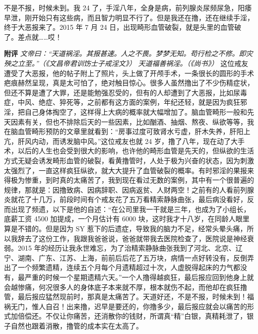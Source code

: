 \begin{case}
    不是不报，时候未到。我 24 了，手淫八年，全身是病，前列腺炎尿频尿急，阳痿早泄，刚开始只有这些病，而且智力明显不行了。但是我还在撸，还在继续手淫，终于大恶报来了。2015 年 7 月 24 日，出现畸形血管破裂，就是头里的血管破了。差点就……哎！

    \textbf{附评} \textit{文帝曰：“天道祸淫。其报甚速。人之不畏。梦梦无知。苟行检之不修。即灾殃之立至。”（《文昌帝君训饬士子戒淫文》）} \textit{天道福善祸淫。（《尚书》）} 这位戒友遭受了大恶报，他的帖子附上了照片，头上做了开颅手术，一条很长的圆形的手术疤痕赫然呈现，真是太可怕了，绝对触目惊心。很多人虽然撸出了不少伤精症状，但还不算是遭了大罪，还是能勉强忍受的，但有的人却遭到了大恶报，比如尿毒症，中风、绝症、猝死等，之前都有这方面的案例，年纪还轻，就是因为疯狂邪淫，把自己身体掏空了，这样得上大病的概率就大幅增加了。脑血管畸形一般和先天因素有关，但也不排除后天的一些因素，比如酗酒、抽烟、熬夜、纵欲等等，我在脑血管畸形预防的文章里就看到：“房事过度可致肾水亏虚，肝木失养，肝阳上亢，肝风内动，而诱发脑中风。”这位戒友也就 24 岁，撸了八年，现在动了大手术，以后的人生也会受到很大的影响，也许他的畸形血管是先天的，但纵欲的生活方式无疑会诱发畸形血管的破裂，看黄撸管时，人处于极为兴奋的状态，因为刺激太强烈了，一直这样疯狂纵欲，就大大提升了血管破裂的概率。有时邪淫的果报来得极为惨重，到时真的太痛苦了，我到现在看过无数的案例，其中有一个很普遍的规律，那就是：因撸致病、因病辞职、因病返贫、人财两空！之前有的人看前列腺炎就花了十几万，前段时间有个戒友花了五万看精索静脉曲张，最后病没看好，反而出现了频遗，以下是他的自述：“在公司里我一干就是三年，也成为了小组长，底薪工资 4500 加提成，一个月估计有 6000 块，这时我才十八岁，在同龄人眼里算是不错的。但是因为 SY 惹下的后遗症，导致我的脑力不足，经常头晕头痛，所以我辞去了这份工作，我跟我爸爸说，爸爸就带我去医院检查了，医院说是神经衰弱。2015 年的经历让我永世难忘，为了治精索静脉曲张我到了河北、北京、辽宁、湖南、广东、江苏、上海，前前后后花了五万块，病情一点好转没有，反倒弄出了一个频繁遗精，连续五个月每个月遗精超过十次，人虚脱得起床的力气都没有，最严重的时候一个星期遗精六天。”一个人撸得越疯狂，最后报应回到他身上就会越惨痛，何况很多人的身体底子本来就不厚，根本就伤不起，而他却在疯狂撸管，最后报应猛然现前时，那真是太痛苦了。天道好还，不是不报，时候未到！福祸无门，惟人自召！出来撸，迟早是要还的，你撸多少，最后报应就会以痛苦的形式加倍偿还。不仅让你痛苦，还消散你的钱财，所谓真“精”白银，真精耗泄了，银子自然也跟着消散，撸管的成本实在太高了。
\end{case}

